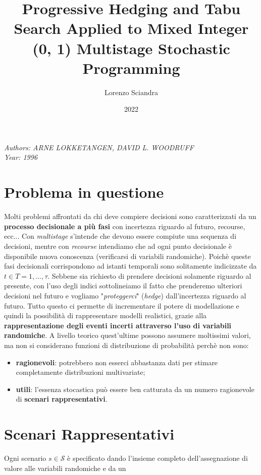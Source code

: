 \documentclass[
]{article}
\title{Progressive Hedging and Tabu Search Applied to Mixed Integer (0,
1) Multistage Stochastic Programming}
\author{Lorenzo Sciandra}
\date{2022}
\providecommand{\tightlist}{%
  \setlength{\itemsep}{0pt}\setlength{\parskip}{0pt}}
\begin{document}
\maketitle

\emph{Authors: ARNE LOKKETANGEN, DAVID L. WOODRUFF}\\
\emph{Year: 1996}
\hypertarget{problema-in-questione}{%
\section{Problema in questione}\label{problema-in-questione}}
Molti problemi affrontati da chi deve compiere decisioni sono
caratterizzati da un \textbf{processo decisionale a più fasi} con
incertezza riguardo al futuro, recourse, ecc... Con \emph{multistage}
s'intende che devono essere compiute una sequenza di decisioni, mentre
con \emph{recourse} intendiamo che ad ogni punto decisionale è
disponibile nuova conoscenza (verificarsi di variabili randomiche).
Poichè queste fasi decisionali corrispondono ad istanti temporali sono
solitamente indicizzate da {\(t \in T = 1,...,\tau\)}. Sebbene sia
richiesto di prendere decisioni solamente riguardo al presente, con
l'uso degli indici sottolineiamo il fatto che prenderemo ulteriori
decisioni nel futuro e vogliamo "\emph{proteggerci}" (\emph{hedge})
dall'incertezza riguardo al futuro. Tutto questo ci permette di
incrementare il potere di modellazione e quindi la possibilità di
rappresentare modelli realistici, grazie alla \textbf{rappresentazione
degli eventi incerti attraverso l'uso di variabili randomiche}. A
livello teorico quest'ultime possono assumere moltissimi valori, ma non
si considerano funzioni di distribuzione di probabilità perchè non sono:
\begin{itemize}
\tightlist
\item
  \textbf{ragionevoli}: potrebbero non esserci abbastanza dati per
  stimare completamente distribuzioni multivariate;
\item
  \textbf{utili}: l'essenza stocastica può essere ben catturata da un
  numero ragionevole di \textbf{scenari rappresentativi}.
\end{itemize}
\hypertarget{scenari-rappresentativi}{%
\section{Scenari Rappresentativi}\label{scenari-rappresentativi}}
Ogni scenario {\(s \in \mathcal{S}\)} è specificato dando l'insieme
completo dell'assegnazione di valore alle variabili randomiche e da un
\end{document}
